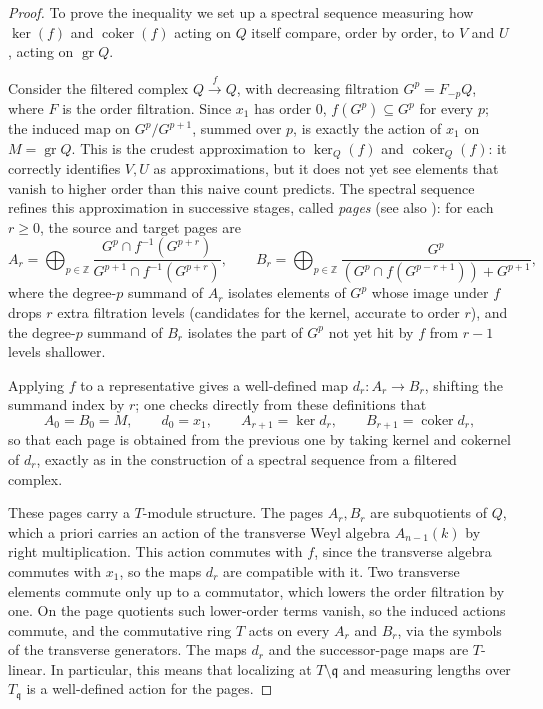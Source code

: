 \documentclass[pdflatex,sn-mathphys-num]{sn-jnl}
\numberwithin{equation}{section}
\theoremstyle{thmstyleone}
\theoremstyle{thmstyletwo}
\newcommand{\gr}{\operatorname{gr}}
\begin{document}
\begin{proof}
To prove the inequality we set up a spectral sequence measuring how $\ker(f)$ and
$\operatorname{coker}(f)$ acting on $Q$ itself compare, order by order, to $V$ and
$U$, acting on $\gr Q$.

Consider the filtered complex $Q\xrightarrow{f}Q$, with decreasing filtration $G^p=F_{-p}Q$, where $F$ is
the order filtration. Since ${x_1}$ has order $0$, $f(G^p)\subseteq G^p$ for every
$p$; the induced map on $G^p/G^{p+1}$, summed over $p$, is exactly the action of
${x_1}$ on $M=\operatorname{gr}Q$. This is the crudest approximation to $\ker_Q(f)$ and
$\operatorname{coker}_Q(f)$: it correctly identifies $V,U$ as approximations, but it
does not yet see elements that vanish to higher order than this naive count
predicts. The spectral sequence refines this approximation in successive stages,
called \emph{pages} (see also \cite[Construction 5.4.6]{weibel}): for each $r\ge0$, the source and target pages are
\[
 A_r=\bigoplus_{p\in\mathbb Z}\frac{G^p\cap f^{-1}(G^{p+r})}{G^{p+1}\cap f^{-1}(G^{p+r})},
 \qquad
 B_r=\bigoplus_{p\in\mathbb Z}\frac{G^p}{(G^p\cap f(G^{p-r+1}))+G^{p+1}},
\]
where the degree-$p$ summand of $A_r$ isolates elements of $G^p$ whose image under
$f$ drops $r$ extra filtration levels (candidates for the kernel, accurate to
order $r$), and the degree-$p$ summand of $B_r$ isolates the part of $G^p$ not yet
hit by $f$ from $r-1$ levels shallower.

Applying $f$ to a representative gives a well-defined map $d_r:A_r\to B_r$,
shifting the summand index by $r$; one checks directly from these definitions that
\[ A_0=B_0=M,\qquad d_0={x_1},\qquad A_{r+1}=\ker d_r,\qquad B_{r+1}=\operatorname{coker}d_r,\]
so that each page is obtained from the previous one by taking kernel and cokernel
of $d_r$, exactly as in the construction of a spectral sequence from a filtered
complex.

These pages carry a $T$-module structure. The pages $A_r,B_r$ are
subquotients of $Q$, which a priori carries an action of the transverse Weyl
algebra $A_{n-1}(k)$ by right multiplication. This action commutes with
$f$, since the transverse algebra commutes with $x_1$, so the maps
$d_r$ are compatible with it. Two transverse elements commute only up to a
commutator, which lowers the order filtration by one. On the page
quotients such lower-order terms vanish, so the induced actions commute, and
the commutative ring $T$ acts on every $A_r$ and $B_r$, via the symbols of
the transverse generators. The maps $d_r$ and the successor-page maps are
$T$-linear. In particular, this means that localizing at $T\setminus\mathfrak q$ and
measuring lengths over $T_{\mathfrak q}$ is a well-defined action for the pages.


\end{proof}
\end{document}
